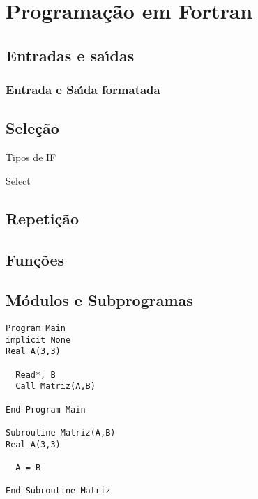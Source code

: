 


\chapter{ Programa\c{c}\~{a}o em Fortran}


    \section{Entradas e sa\'{\i}das}

          \subsection{Entrada e Sa\'{\i}da formatada}


    \section{Sele\c{c}\~{a}o}
    Tipos de IF

    Select

    \section{Repeti\c{c}\~{a}o}

    \section{Fun\c{c}\~{o}es}



    \section{M\'{o}dulos e Subprogramas}


   \begin{lstlisting}
Program Main
implicit None
Real A(3,3)

  Read*, B
  Call Matriz(A,B)

End Program Main

Subroutine Matriz(A,B)
Real A(3,3)

  A = B

End Subroutine Matriz

    \end{lstlisting}


